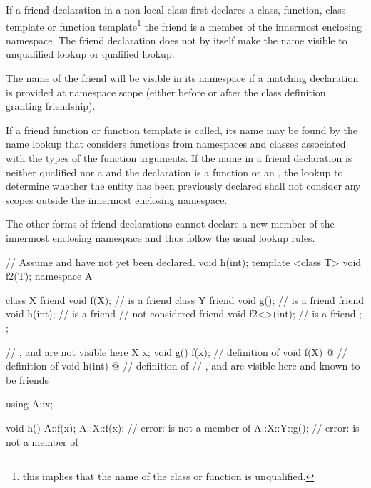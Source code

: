 \pnum
If a friend declaration in a non-local class first declares a
class, function, class template or function template\footnote{this implies that the name of the class or function is unqualified.}
the friend is a member of the innermost enclosing
namespace. The friend declaration does not by itself make the name
visible to unqualified lookup or qualified
lookup.
\begin{note}
The name of the friend will be
visible in its namespace if a matching declaration is provided at namespace
scope (either before or after the class definition granting friendship).
\end{note}
If a friend
function or function template is called, its name may be found by the
name lookup that considers functions from namespaces and classes
associated with the types of the function
arguments. If the
name in a friend declaration is neither qualified nor a
 and the declaration is a function or an
, the lookup to determine whether
the entity has been previously declared shall not consider any scopes
outside the innermost enclosing namespace.
\begin{note}
The other forms of
friend declarations cannot declare a new member of the innermost
enclosing namespace and thus follow the usual lookup rules.
\end{note}
\begin{example}
\begin{codeblock}
// Assume  and  have not yet been declared.
void h(int);
template <class T> void f2(T);
namespace A {
  class X {
    friend void f(X);           //  is a friend
    class Y {
      friend void g();          //  is a friend
      friend void h(int);       //  is a friend
                                //  not considered
      friend void f2<>(int);    //  is a friend
    };
  };

  // ,  and  are not visible here
  X x;
  void g() { f(x); }            // definition of 
  void f(X) { @\commentellip@ }       // definition of 
  void h(int) { @\commentellip@ }     // definition of 
  // ,  and  are visible here and known to be friends
}

using A::x;

void h() {
  A::f(x);
  A::X::f(x);                   // error:  is not a member of 
  A::X::Y::g();                 // error:  is not a member of 
}
\end{codeblock}
\end{example}

